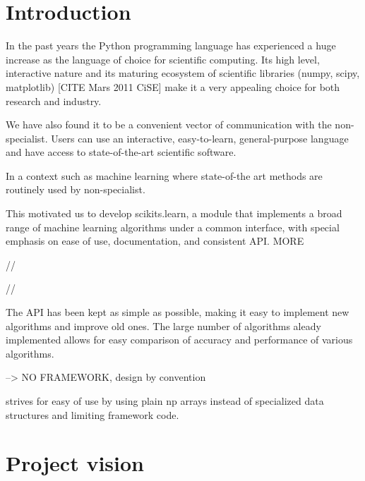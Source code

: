 \documentclass[twoside,11pt]{article}
\begin{document}
\section{Introduction}
In the past years the Python programming language has experienced a
huge increase as the language of choice for scientific computing. Its
high level, interactive nature and its maturing ecosystem of
scientific libraries (numpy, scipy, matplotlib) [CITE Mars 2011 CiSE]
make it a very appealing choice for both research and industry.

We have also found it to be a convenient vector of communication with
the non-specialist.  Users can use an interactive, easy-to-learn,
general-purpose language and have access to state-of-the-art
scientific software.

In a context such as
machine learning where state-of-the art methods are routinely used by
non-specialist.


This motivated us to develop scikits.learn, a module that implements a
broad range of machine learning algorithms under a common interface,
with special emphasis on ease of use, documentation, and consistent
API. MORE


//

//


The API has been kept as simple as possible, making it easy to
implement new algorithms and improve old ones. The large number of
algorithms aleady implemented allows for easy comparison of accuracy
and performance of various algorithms.

--> NO FRAMEWORK, design by convention

strives for easy of use by using plain np arrays instead of specialized
data structures and limiting framework code.


\section{Project vision}
\end{document}
